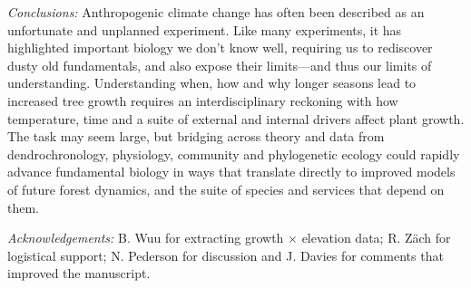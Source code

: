 \documentclass[11pt]{article}
\begin{document}
\emph{Conclusions:} 
Anthropogenic climate change has often been described as an unfortunate and unplanned experiment. Like many experiments, it has highlighted important biology we don't know well, requiring us to rediscover dusty old fundamentals, and also expose their limits---and thus our limits of understanding. Understanding when, how and why longer seasons lead to increased tree growth requires an interdisciplinary reckoning with how temperature, time and a suite of external and internal drivers affect plant growth. The task may seem large, but bridging across theory and data from dendrochronology, physiology, community and phylogenetic ecology could rapidly advance fundamental biology in ways that translate directly to improved models of future forest dynamics, and the suite of species and services that depend on them. %



\emph{Acknowledgements:} B. Wuu for extracting growth $\times$ elevation data; R. Z{\"a}ch for logistical support; N. Pederson for discussion and J. Davies for comments that improved the manuscript. 

\iffalse
\end{document}
